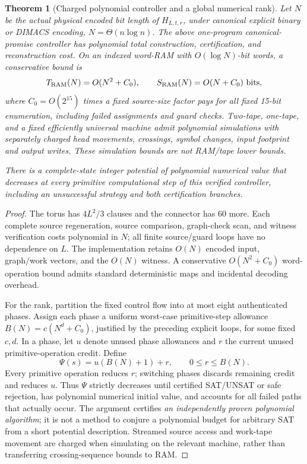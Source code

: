 \documentclass[11pt]{article}
\newtheorem{theorem}{Theorem}
\begin{document}
\begin{theorem}[Charged polynomial controller and a global numerical rank]\label{th:cost}
Let $N$ be the actual physical encoded bit length of $H_{L,t,r}$, under canonical explicit binary or DIMACS encoding, $N=\Theta(n\log n)$. The above one-program canonical-promise controller has polynomial total construction, certification, and reconstruction cost. On an indexed word-RAM with $O(\log N)$-bit words, a conservative bound is
\[
T_{\rm RAM}(N)=O(N^2+C_0),\qquad S_{\rm RAM}(N)=O(N+C_0)\text{ bits},
\]
where $C_0=O(2^{15})$ times a fixed source-size factor pays for all fixed 15-bit enumeration, including failed assignments and guard checks. Two-tape, one-tape, and a fixed efficiently universal machine admit polynomial simulations with \emph{separately charged} head movements, crossings, symbol changes, input footprint and output writes. These simulation bounds are not RAM/tape lower bounds.

There is a complete-state integer potential of \emph{polynomial numerical value} that decreases at every primitive computational step of this verified controller, including an unsuccessful strategy and both certification branches.
\end{theorem}
\begin{proof}
The torus has $4L^2/3$ clauses and the connector has 60 more. Each complete source regeneration, source comparison, graph-check scan, and witness verification costs polynomial in $N$; all finite source/guard loops have no dependence on $L$. The implementation retains $O(N)$ encoded input, graph/work vectors, and the $O(N)$ witness. A conservative $O(N^2+C_0)$ word-operation bound admits standard deterministic maps and incidental decoding overhead.

For the rank, partition the fixed control flow into at most eight authenticated phases. Assign each phase a uniform worst-case primitive-step allowance $B(N)=c(N^d+C_0)$, justified by the preceding explicit loops, for some fixed $c,d$. In a phase, let $u$ denote unused phase allowances and $r$ the current unused primitive-operation credit. Define
\[
\Psi(s)=u(B(N)+1)+r,
\qquad 0\le r\le B(N).
\]
Every primitive operation reduces $r$; switching phases discards remaining credit and reduces $u$. Thus $\Psi$ strictly decreases until certified SAT/UNSAT or safe rejection, has polynomial numerical initial value, and accounts for all failed paths that actually occur. The argument certifies \emph{an independently proven polynomial algorithm}; it is not a method to conjure a polynomial budget for arbitrary SAT from a short potential description. Streamed source access and work-tape movement are charged when simulating on the relevant machine, rather than transferring crossing-sequence bounds to RAM.
\end{proof}
\end{document}
